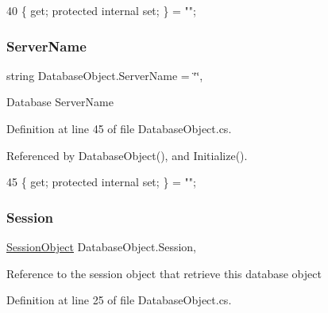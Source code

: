\begin{DoxyCode}
40 \{ \textcolor{keyword}{get}; \textcolor{keyword}{protected} \textcolor{keyword}{internal} \textcolor{keyword}{set}; \} = \textcolor{stringliteral}{""};
\end{DoxyCode}
\mbox{\label{class_database_object_ad6bfcd30152f7a115ac5a1c7fbfa9fcb}} 
\subsubsection{\texorpdfstring{Server\+Name}{ServerName}}
{\footnotesize\ttfamily string Database\+Object.\+Server\+Name = \char`\"{}\char`\"{}\hspace{0.3cm}{\ttfamily [get]}, {\ttfamily [set]}}



Database Server\+Name 



Definition at line 45 of file Database\+Object.\+cs.



Referenced by Database\+Object(), and Initialize().


\begin{DoxyCode}
45 \{ \textcolor{keyword}{get}; \textcolor{keyword}{protected} \textcolor{keyword}{internal} \textcolor{keyword}{set}; \} = \textcolor{stringliteral}{""};
\end{DoxyCode}
\mbox{\label{class_database_object_aa8484162b7d2a7c4c9426bca13c64c07}} 
\subsubsection{\texorpdfstring{Session}{Session}}
{\footnotesize\ttfamily \mbox{\hyperlink{class_session_object}{Session\+Object}} Database\+Object.\+Session\hspace{0.3cm}{\ttfamily [get]}, {\ttfamily [set]}}



Reference to the session object that retrieve this database object 



Definition at line 25 of file Database\+Object.\+cs.



